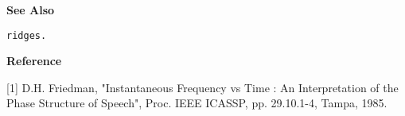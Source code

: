 \newpage

{\bf \large \sf See Also}\\
\hspace*{1.5cm}
\begin{minipage}[t]{13.5cm}
\begin{verbatim}
ridges.
\end{verbatim}
\end{minipage}
\vspace*{.5cm}


{\bf \large \sf Reference}\\
\hspace*{1.5cm}
\begin{minipage}[t]{13.5cm}
[1] D.H. Friedman, "Instantaneous Frequency vs Time : An
Interpretation of the Phase Structure of Speech", Proc. IEEE
ICASSP, pp. 29.10.1-4, Tampa, 1985.	
\end{minipage}





